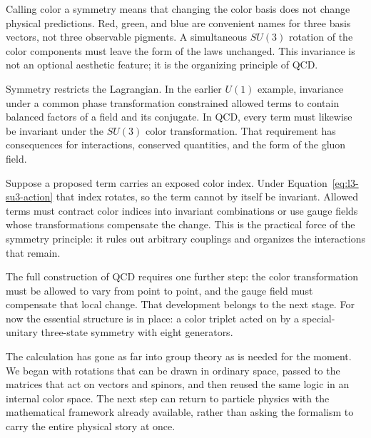 Calling color a symmetry means that changing the color basis does not change
physical predictions. Red, green, and blue are convenient names for three
basis vectors, not three observable pigments. A simultaneous \(SU(3)\)
rotation of the color components must leave the form of the laws unchanged.
This invariance is not an optional aesthetic feature; it is the organizing
principle of QCD.

Symmetry restricts the Lagrangian. In the earlier \(U(1)\) example, invariance
under a common phase transformation constrained allowed terms to contain
balanced factors of a field and its conjugate. In QCD, every term must likewise
be invariant under the \(SU(3)\) color transformation. That requirement has
consequences for interactions, conserved quantities, and the form of the
gluon field.

Suppose a proposed term carries an exposed color index. Under
Equation~\eqref{eq:l3-su3-action} that index rotates, so the term cannot by
itself be invariant. Allowed terms must contract color indices into invariant
combinations or use gauge fields whose transformations compensate the change.
This is the practical force of the symmetry principle: it rules out arbitrary
couplings and organizes the interactions that remain.

The full construction of QCD requires one further step: the color
transformation must be allowed to vary from point to point, and the gauge
field must compensate that local change. That development belongs to the next
stage. For now the essential structure is in place: a color triplet acted on
by a special-unitary three-state symmetry with eight generators.

The calculation has gone as far into group theory as is needed for the moment.
We began with rotations that can be drawn in ordinary space, passed to the
matrices that act on vectors and spinors, and then reused the same logic in an
internal color space. The next step can return to particle physics with the
mathematical framework already available, rather than asking the formalism to
carry the entire physical story at once.
